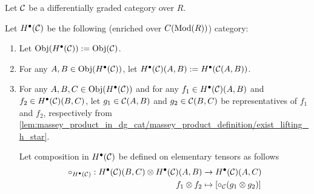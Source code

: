 \begin{definition}
    Let \( {\mathcal{C}} \) be a differentially graded category over  \( R \).

    Let \( H^\bullet({\mathcal{C}}) \) be the following (enriched over \( C(\operatorname{Mod}(R)) \)) category:
    \begin{enumerate}
        \item Let \( \operatorname{Obj}(H^\bullet({\mathcal{C}})) := \operatorname{Obj}({\mathcal{C}}) \).
        \item For any \( A, B \in \operatorname{Obj}(H^\bullet({\mathcal{C}})) \), let \( H^\bullet({\mathcal{C}})(A, B) := H^\bullet ({\mathcal{C}}(A, B)) \).
        \item {
            For any \( A, B, C \in \operatorname{Obj}(H^\bullet({\mathcal{C}})) \) and for any \( f_1 \in H^\bullet({\mathcal{C}})(A, B) \) and \( f_2 \in H^\bullet({\mathcal{C}})(B, C) \), let \( g_1 \in {\mathcal{C}}(A, B) \) and \( g_2 \in {\mathcal{C}}(B, C) \) be representatives of \( f_1 \) and \( f_2 \), respectively from \autoref{lem:massey_product_in_dg_cat/massey_product_definition/exist_lifting_h_star}.

            Let composition in \( H^\bullet({\mathcal{C}}) \) be defined on elementary tensors as follows
            \begin{align*}
                \circ_{H^\bullet({\mathcal{C}})}: H^\bullet({\mathcal{C}})(B, C) \otimes H^\bullet({\mathcal{C}})(A, B) &\to H^\bullet({\mathcal{C}})(A, C) \\
                f_1 \otimes f_2 &\mapsto [ \circ_{{\mathcal{C}}}(g_1 \otimes g_2) ]
            \end{align*}
        }
    \end{enumerate}
\end{definition}


